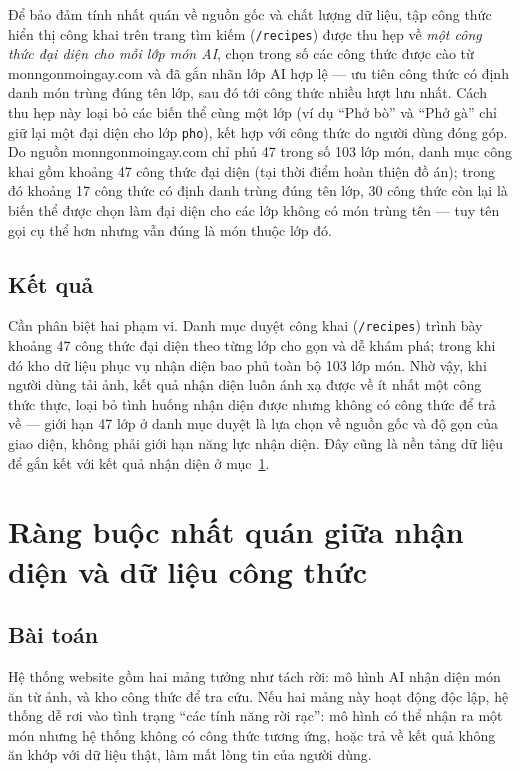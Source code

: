 \documentclass[../DoAn.tex]{subfiles}
\begin{document}
Để bảo đảm tính nhất quán về nguồn gốc và chất lượng dữ liệu, tập công thức hiển thị công khai trên trang tìm kiếm (\texttt{/recipes}) được thu hẹp về \emph{một công thức đại diện cho mỗi lớp món AI}, chọn trong số các công thức được cào từ monngonmoingay.com và đã gắn nhãn lớp AI hợp lệ --- ưu tiên công thức có định danh món trùng đúng tên lớp, sau đó tới công thức nhiều lượt lưu nhất. Cách thu hẹp này loại bỏ các biến thể cùng một lớp (ví dụ ``Phở bò'' và ``Phở gà'' chỉ giữ lại một đại diện cho lớp \texttt{pho}), kết hợp với công thức do người dùng đóng góp. Do nguồn monngonmoingay.com chỉ phủ 47 trong số 103 lớp món, danh mục công khai gồm khoảng 47 công thức đại diện (tại thời điểm hoàn thiện đồ án); trong đó khoảng 17 công thức có định danh trùng đúng tên lớp, 30 công thức còn lại là biến thể được chọn làm đại diện cho các lớp không có món trùng tên --- tuy tên gọi cụ thể hơn nhưng vẫn đúng là món thuộc lớp đó.

\subsection*{Kết quả}
Cần phân biệt hai phạm vi. Danh mục duyệt công khai (\texttt{/recipes}) trình bày khoảng 47 công thức đại diện theo từng lớp cho gọn và dễ khám phá; trong khi đó kho dữ liệu phục vụ nhận diện bao phủ toàn bộ 103 lớp món. Nhờ vậy, khi người dùng tải ảnh, kết quả nhận diện luôn ánh xạ được về ít nhất một công thức thực, loại bỏ tình huống nhận diện được nhưng không có công thức để trả về --- giới hạn 47 lớp ở danh mục duyệt là lựa chọn về nguồn gốc và độ gọn của giao diện, không phải giới hạn năng lực nhận diện. Đây cũng là nền tảng dữ liệu để gắn kết với kết quả nhận diện ở mục~\ref{sec:5-rangbuoc}.

\section{Ràng buộc nhất quán giữa nhận diện và dữ liệu công thức}
\label{sec:5-rangbuoc}

\subsection*{Bài toán}
Hệ thống website gồm hai mảng tưởng như tách rời: mô hình AI nhận diện món ăn từ ảnh, và kho công thức để tra cứu. Nếu hai mảng này hoạt động độc lập, hệ thống dễ rơi vào tình trạng ``các tính năng rời rạc'': mô hình có thể nhận ra một món nhưng hệ thống không có công thức tương ứng, hoặc trả về kết quả không ăn khớp với dữ liệu thật, làm mất lòng tin của người dùng.
\end{document}
